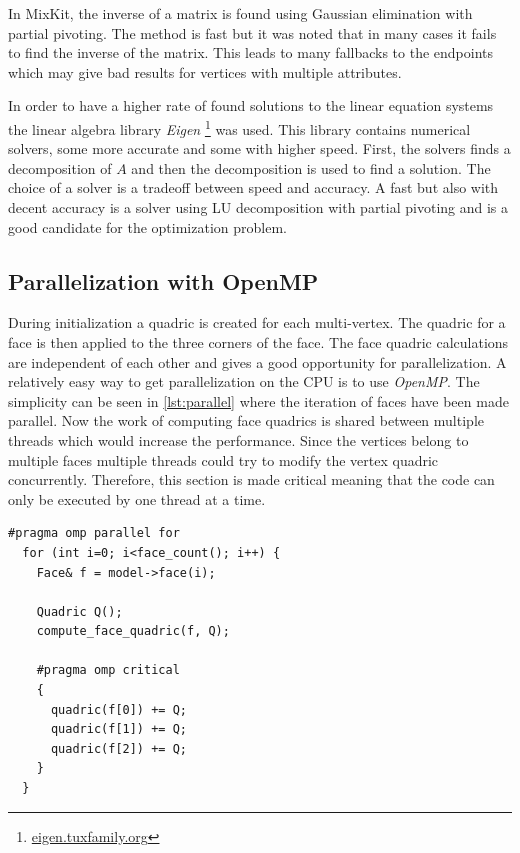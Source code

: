 In MixKit, the inverse of a matrix is found using Gaussian elimination with partial pivoting. The method is fast but it was noted that in many cases it fails to find the inverse of the matrix. This leads to many fallbacks to the endpoints which may give bad results for vertices with multiple attributes.

In order to have a higher rate of found solutions to the linear equation systems the linear algebra library \emph{Eigen} \footnote{\href{http://eigen.tuxfamily.org}{eigen.tuxfamily.org}} was used. This library contains numerical solvers, some more accurate and some with higher speed. First, the solvers finds a decomposition of $A$ and then the decomposition is used to find a solution. The choice of a solver is a tradeoff between speed and accuracy. A fast but also with decent accuracy is a solver using LU decomposition with partial pivoting and is a good candidate for the optimization problem. 

\subsection{Parallelization with OpenMP}
During initialization a quadric is created for each multi-vertex. The quadric for a face is then applied to the three corners of the face. The face quadric calculations are independent of each other and gives a good opportunity for parallelization. A relatively easy way to get parallelization on the CPU is to use \emph{OpenMP}. The simplicity can be seen in \cref{lst:parallel} where the iteration of faces have been made parallel. Now the work of computing face quadrics is shared between multiple threads which would increase the performance. Since the vertices belong to multiple faces multiple threads could try to modify the vertex quadric concurrently. Therefore, this section is made critical meaning that the code can only be executed by one thread at a time.


\begin{minipage}{\textwidth}
\begin{lstlisting}[caption={Parallelization with OpenMP}, label={lst:parallel}]
  #pragma omp parallel for
  for (int i=0; i<face_count(); i++) {
    Face& f = model->face(i);

    Quadric Q();
    compute_face_quadric(f, Q);

    #pragma omp critical
    {
      quadric(f[0]) += Q;
      quadric(f[1]) += Q;
      quadric(f[2]) += Q;
    }
  }
\end{lstlisting}
\end{minipage}

